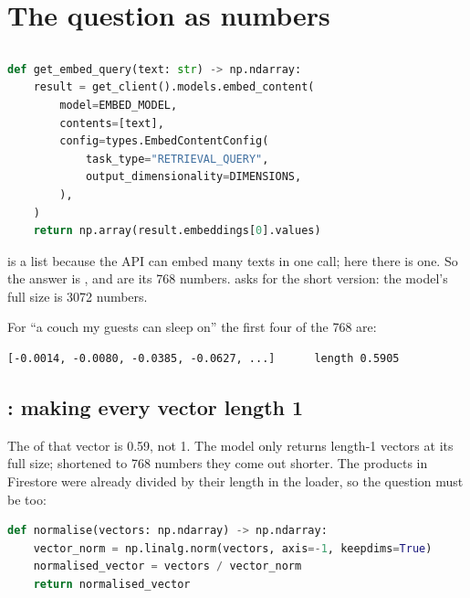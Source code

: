 \documentclass[11pt]{article}
\begin{document}
\section{The question as numbers}
\label{sec:question}

\subsection{}

\begin{lstlisting}[language=Python]
def get_embed_query(text: str) -> np.ndarray:
    result = get_client().models.embed_content(
        model=EMBED_MODEL,
        contents=[text],
        config=types.EmbedContentConfig(
            task_type="RETRIEVAL_QUERY",
            output_dimensionality=DIMENSIONS,
        ),
    )
    return np.array(result.embeddings[0].values)
\end{lstlisting}

 is a list because the API can embed many texts in one
call; here there is one. So the answer is ,
and  are its 768 numbers. 
asks for the short version: the model's full size is 3072 numbers.

For ``a couch my guests can sleep on'' the first four of the 768 are:
\begin{lstlisting}
[-0.0014, -0.0080, -0.0385, -0.0627, ...]      length 0.5905
\end{lstlisting}

\subsection{: making every vector length 1}

The  of that vector is
0.59, not 1. The model only returns length-1 vectors at its full size;
shortened to 768 numbers they come out shorter. The products in
Firestore were already divided by their length in the loader, so the
question must be too:
\begin{lstlisting}[language=Python]
def normalise(vectors: np.ndarray) -> np.ndarray:
    vector_norm = np.linalg.norm(vectors, axis=-1, keepdims=True)
    normalised_vector = vectors / vector_norm
    return normalised_vector
\end{lstlisting}
\end{document}
